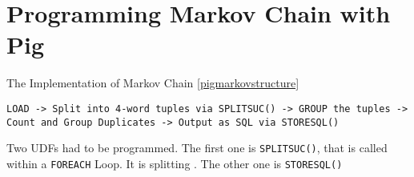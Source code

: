 \section{Programming Markov Chain with Pig}                                              

The Implementation of Markov Chain \ref{pigmarkovstructure}   
                         
\begin{lstlisting}[language=pig,caption=Pig Latin Script Structure ,label=pigmarkovstructure]    
LOAD -> Split into 4-word tuples via SPLITSUC() -> GROUP the tuples -> Count and Group Duplicates -> Output as SQL via STORESQL()
\end{lstlisting}

Two UDFs had to be programmed. 
The first one is {\tt SPLITSUC()}, that is called within a {\tt FOREACH} Loop. It is splitting .
The other one is {\tt STORESQL()} 